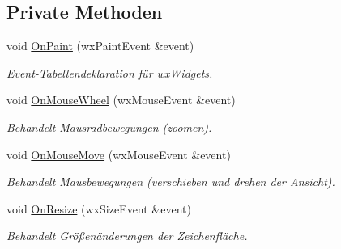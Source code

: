 \subsection*{Private Methoden}
\begin{DoxyCompactItemize}
\item 
void \hyperlink{classGUIGLCanvas_a83f52d08591920a339150c2f45069c8f}{On\-Paint} (wx\-Paint\-Event \&event)
\begin{DoxyCompactList}\small\item\em Event-\/\-Tabellendeklaration für wx\-Widgets. \end{DoxyCompactList}\item 
void \hyperlink{classGUIGLCanvas_a0ee8fe9339ebb330b8133a620bd67514}{On\-Mouse\-Wheel} (wx\-Mouse\-Event \&event)
\begin{DoxyCompactList}\small\item\em Behandelt Mausradbewegungen (zoomen). \end{DoxyCompactList}\item 
void \hyperlink{classGUIGLCanvas_a9c089336b9485f1abcc60a1a7fb85bb7}{On\-Mouse\-Move} (wx\-Mouse\-Event \&event)
\begin{DoxyCompactList}\small\item\em Behandelt Mausbewegungen (verschieben und drehen der Ansicht). \end{DoxyCompactList}\item 
void \hyperlink{classGUIGLCanvas_aba4aa683bf8226da8182779de38ef5db}{On\-Resize} (wx\-Size\-Event \&event)
\begin{DoxyCompactList}\small\item\em Behandelt Größenänderungen der Zeichenfläche. \end{DoxyCompactList}\end{DoxyCompactItemize}
